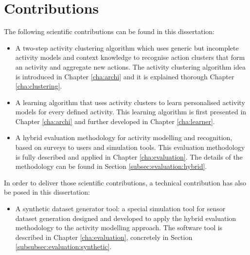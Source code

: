\section{Contributions}
\label{sec:intro:contributions}

The following scientific contributions can be found in this dissertation:

\begin{itemize}
  \item A two-step activity clustering algorithm which uses generic but incomplete activity models and context knowledge to recognise action clusters that form an activity and aggregate new actions. The activity clustering algorithm idea is introduced in Chapter \ref{cha:archi} and it is explained thorough Chapter \ref{cha:clustering}.
  \item A learning algorithm that uses activity clusters to learn personalised activity models for every defined activity. This learning algorithm is first presented in Chapter \ref{cha:archi} and further developed in Chapter \ref{cha:learner}.
  \item A hybrid evaluation methodology for activity modelling and recognition, based on surveys to users and simulation tools. This evaluation methodology is fully described and applied in Chapter \ref{cha:evaluation}. The details of the methodology can be found in Section \ref{subsec:evaluation:hybrid}.
\end{itemize}

In order to deliver those scientific contributions, a technical contribution has also be posed in this dissertation:

\begin{itemize}
 \item A synthetic dataset generator tool: a special simulation tool for sensor dataset generation designed and developed to apply the hybrid evaluation methodology to the activity modelling approach. The software tool is described in Chapter \ref{cha:evaluation}, concretely in Section \ref{subsubsec:evaluation:synthetic}.
\end{itemize}
